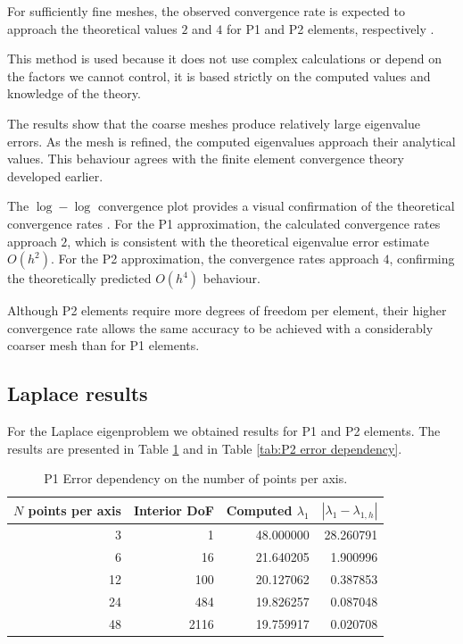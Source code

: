 \documentclass[acmsmall,screen]{MapleTrans}
\begin{document}
For sufficiently fine meshes, the observed convergence rate is expected to approach the theoretical values $2$ and $4$ for P1 and P2 elements, respectively \cite{b12.4}.

This method is used because it does not use complex calculations or depend on the factors we cannot control, it is based strictly on the computed values and knowledge of the theory.

The results show that the coarse meshes produce relatively large eigenvalue errors. As the mesh is refined, the computed eigenvalues approach their analytical values. This behaviour agrees with the finite element convergence theory developed earlier.

The $\log-\log$ convergence plot provides a visual confirmation of the theoretical convergence rates \cite{b26}. For the P1 approximation, the calculated convergence rates approach $2$, which is consistent with the theoretical eigenvalue error estimate $O(h^2)$. For the P2 approximation, the convergence rates approach $4$, confirming the theoretically predicted $O(h^4)$ behaviour.

Although P2 elements require more degrees of freedom per element, their higher convergence rate allows the same accuracy to be achieved with a considerably coarser mesh than for P1 elements.


\subsection{Laplace results} \label{sec: P1 vs P2}
For the Laplace eigenproblem we obtained results for P1 and P2 elements. The results are presented in Table \ref{tab:P1 error dependency} and in Table \ref{tab:P2 error dependency}.
\begin{table}[H]
    \centering
    \caption{P1 Error dependency on the number of points per axis.}
    \label{tab:P1 error dependency}
    \begin{tabular}{rrrr}
        \toprule
        $N$ points per axis & Interior DoF & Computed $\lambda_1$ & $|\lambda_1 - \lambda_{1,h}|$ \\
        \midrule
        3 & 1 & 48.000000 & 28.260791 \\
        6 & 16 & 21.640205 & 1.900996 \\
        12 & 100 & 20.127062 & 0.387853 \\
        24 & 484 & 19.826257 & 0.087048 \\
        48 & 2116 & 19.759917 & 0.020708 \\
        \bottomrule
    \end{tabular}
\end{table}
\end{document}
